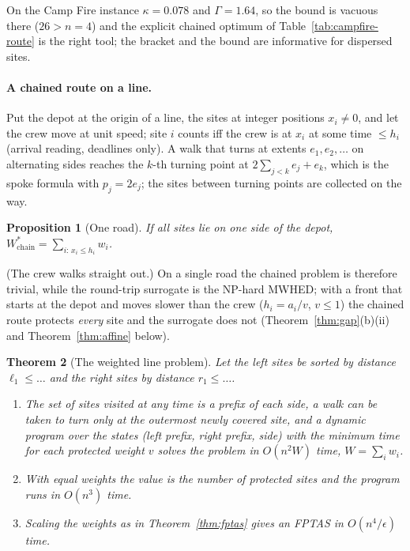 \documentclass[pdflatex,sn-mathphys-ay]{sn-jnl}
\theoremstyle{thmstyleone}
\newtheorem{theorem}{Theorem}
\newtheorem{proposition}[theorem]{Proposition}
\theoremstyle{thmstyletwo}
\theoremstyle{thmstylethree}
\begin{document}
On the Camp Fire instance $\kappa=0.078$ and $\Gamma=1.64$, so the bound
is vacuous there ($26>n=4$) and the explicit chained optimum of
Table~\ref{tab:campfire-route} is the right tool; the bracket and the
bound are informative for dispersed sites.

\paragraph{A chained route on a line.} Put the depot at the origin of a
line, the sites at integer positions $x_i\ne0$, and let the crew move at
unit speed; site $i$ counts iff the crew is at $x_i$ at some time
$\le h_i$ (arrival reading, deadlines only). A walk that turns at extents
$e_1,e_2,\dots$ on alternating sides reaches the $k$-th turning point at
$2\sum_{j<k}e_j+e_k$, which is the spoke formula with $p_j=2e_j$; the
sites between turning points are collected on the way.

\begin{proposition}[One road]\label{prop:ray}
If all sites lie on one side of the depot, $W^\ast_{\mathrm{chain}}=\sum_{i:\,x_i\le h_i}w_i$.
\end{proposition}

(The crew walks straight out.) On a single road the chained problem is
therefore trivial, while the round-trip surrogate is the NP-hard MWHED;
with a front that starts at the depot and moves slower than the crew
($h_i=a_i/v$, $v\le1$) the chained route protects \emph{every} site and the
surrogate does not (Theorem~\ref{thm:gap}(b)(ii) and
Theorem~\ref{thm:affine} below).

\begin{theorem}[The weighted line problem]\label{thm:linealg}
Let the left sites be sorted by distance $\ell_1\le\dots$ and the right
sites by distance $r_1\le\dots$.
\begin{enumerate}
\item[(a)] The set of sites visited at any time is a prefix of each side, a walk can be taken to turn only at the outermost newly covered site, and
a dynamic program over the states (left prefix, right prefix, side) with the minimum time for each protected weight $v$
solves the problem in $O(n^2W)$ time, $W=\sum_iw_i$.
\item[(b)] With equal weights the value is the number of protected sites and the program runs in $O(n^3)$ time.
\item[(c)] Scaling the weights as in Theorem~\ref{thm:fptas} gives an FPTAS in $O(n^4/\epsilon)$ time.
\end{enumerate}
\end{theorem}
\end{document}
